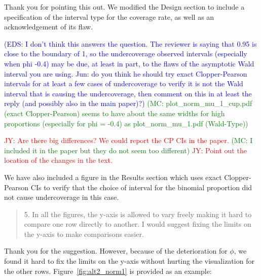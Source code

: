 \documentclass[12pt]{article}
\newcommand{\jy}[1]{\textcolor{red}{JY: #1}}
\newcommand{\eds}[1]{\textcolor{blue}{(EDS: #1)}}
\newcommand{\mc}[1]{\textcolor{green}{(MC: #1)}}
\newenvironment{comment}%
{\begin{quotation}\noindent\small\it\color{darkblue}\ignorespaces%
}{\end{quotation}}
\begin{document}
Thank you for pointing this out. We modified the Design section to include a 
specification of the interval type for the coverage rate, as well as an 
acknowledgement of its flaw.

\eds{I don't think this answers the question.  The reviewer is saying that 0.95 
is close to the boundary of 1, so the undercoverage observed intervals
(especially when phi -0.4) may be due, at least in part, to the flaws 
of the asymptotic Wald interval you are using. 
\@ Jun: do you think he should try exact Clopper-Pearson
intervals for at least a few cases of undercoverage to verify it is not the Wald
interval that is causing the undercoverage, then comment on this in at least the
reply (and possibly also in the main paper)?}
\mc{plot\_norm\_mu\_1\_cup.pdf (exact Clopper-Pearson) seems to have about the same 
widths for high 
proportions
(especially for phi = -0.4) as {plot\_norm\_mu\_1.pdf} (Wald-Type)}

\jy{Are there big differences? We could report the CP CIs in the paper.}
\mc{I included it in the paper but they do not seem too different}
\jy{Point out the location of the changes in the text.}
  
We have also included a figure in the Results section which 
uses exact 
Clopper-Pearson CIs to verify that the choice of interval
for the binomial proportion did not cause undercoverage in this case.


\begin{comment}
5.  In all the figures, the y-axis is allowed to vary freely making it hard to 
compare one row directly to another.  I would suggest fixing the limits on the 
y-axis to make comparisons easier.  
\end{comment}

Thank you for the suggestion. However, because of the deterioration for $\phi$, 
we found it hard to fix the limits on the 
y-axis without hurting the visualization for the other rows. 
Figure~\ref{fig:alt2_norm1} is provided as an example:
\end{document}
